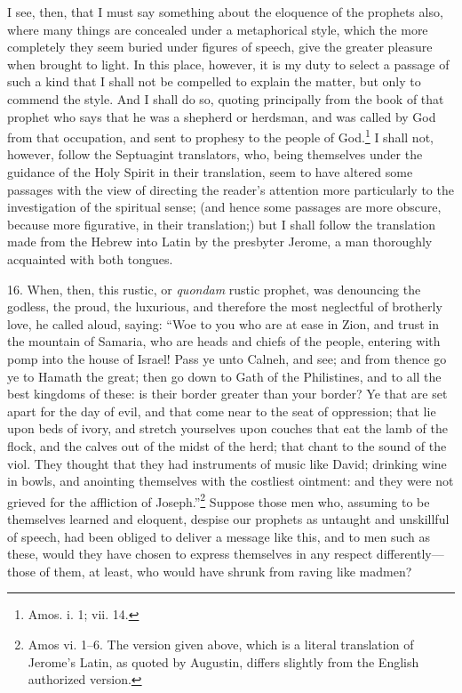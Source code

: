 I see, then, that I must say something about the eloquence of the prophets also, where many things are concealed under a metaphorical style, which the more completely they seem buried under figures of speech, give the greater pleasure when brought to light. In this place, however, it is my duty to select a passage of such a kind that I shall not be compelled to explain the matter, but only to commend the style. And I shall do so, quoting principally from the book of that prophet who says that he was a shepherd or herdsman, and was called by God from that occupation, and sent to prophesy to the people of God.\footnote{Amos. i. 1; vii. 14.} I shall not, however, follow the Septuagint translators, who, being themselves under the guidance of the Holy Spirit in their  translation, seem to have altered some passages with the view of directing the reader’s attention more particularly to the investigation of the spiritual sense; (and hence some passages are more obscure, because more figurative, in their translation;) but I shall follow the translation made from the Hebrew into Latin by the presbyter Jerome, a man thoroughly acquainted with both tongues.

16. When, then, this rustic, or \emph{quondam} rustic prophet, was denouncing the godless, the proud, the luxurious, and therefore the most neglectful of brotherly love, he called aloud, saying: “Woe to you who are at ease in Zion, and trust in the mountain of Samaria, who are heads and chiefs of the people, entering with pomp into the house of Israel! Pass ye unto Calneh, and see; and from thence go ye to Hamath the great; then go down to Gath of the Philistines, and to all the best kingdoms of these: is their border greater than your border? Ye that are set apart for the day of evil, and that come near to the seat of oppression; that lie upon beds of ivory, and stretch yourselves upon couches that eat the lamb of the flock, and the calves out of the midst of the herd; that chant to the sound of the viol. They thought that they had instruments of music like David; drinking wine in bowls, and anointing themselves with the costliest ointment: and they were not grieved for the affliction of Joseph.”\footnote{Amos vi. 1–6. The version given above, which is a literal translation of Jerome’s Latin, as quoted by Augustin, differs slightly from the English authorized version.} Suppose those men who, assuming to be themselves learned and eloquent, despise our prophets as untaught and unskillful of speech, had been obliged to deliver a message like this, and to men such as these, would they have chosen to express themselves in any respect differently—those of them, at least, who would have shrunk from raving like madmen?

